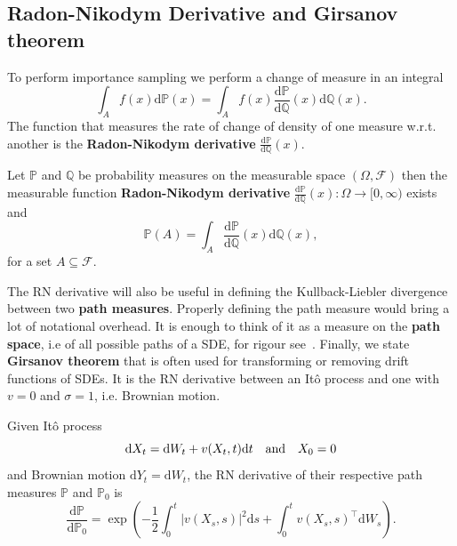 \subsection{Radon-Nikodym Derivative and Girsanov theorem}
To perform importance sampling we perform a change of measure in an integral
\begin{equation}
	\int_{A} f(x) \mathrm{d} \mathbb{P}(x)=\int_{A} f(x) \frac{\mathrm{d} \mathbb{P}}{\mathrm{d} \mathbb{Q}}(x) \mathrm{d} \mathbb{Q}(x).
\end{equation}
The function that measures the rate of change of density of one measure w.r.t. another is the \textbf{Radon-Nikodym derivative} $\frac{\mathrm{d} \mathbb{P}}{\mathrm{d} \mathbb{Q}}(x)$.

\begin{theorem}
	Let $\mathbb{P}$ and $\mathbb{Q}$ be probability measures on the measurable space $(\Omega, \mathcal{F})$ then the measurable function \textbf{Radon-Nikodym derivative} $\frac{\mathrm{d} \mathbb{P}}{\mathrm{d} \mathbb{Q}}(x): \Omega \rightarrow[0, \infty)$ exists and 
	\begin{equation}
		\mathbb{P}(A)=\int_{A} \frac{\mathrm{d} \mathbb{P}}{\mathrm{d} \mathbb{Q}}(x) \mathrm{d} \mathbb{Q}(x),
	\end{equation}
	for a set $A \subseteq \mathcal{F}$.
\end{theorem}
The RN derivative will also be useful in defining the Kullback-Liebler divergence between two \textbf{path measures}. Properly defining the path measure would bring a lot of notational overhead. It is enough to think of it as a measure on the \textbf{path space}, i.e of all possible paths of a SDE, for rigour see~\cite{leonard2014pathmeasure}. 
Finally, we state \textbf{Girsanov theorem} that is often used for transforming or removing drift functions of SDEs. It is the RN derivative between an It\^ o process and one with $v = 0$ and $\sigma = 1$, i.e. Brownian motion. 
\begin{theorem}
	Given It\^ o process
	\begin{equation}
		\mathrm{d}X_t = \mathrm{d}W_t + v(X_t, t)\mathrm{d}t \quad \text{and} \quad X_0 = 0 \\
	\end{equation}
	and Brownian motion $\mathrm{d}Y_t = \mathrm{d}W_t$, the RN derivative of their respective path measures $\mathbb{P}$ and $\mathbb{P}_0$	is
	\begin{equation}
		\label{eq:Girsanov_theorem}
		\frac{\mathrm{d} \mathbb{P}}{\mathrm{d} \mathbb{P}_0}=
		\exp \left(
		-\frac{1}{2} \int_{0}^{t}\left|v(X_s, s)\right|^{2} \mathrm{d} s+\int_{0}^{t} v(X_s, s)^{\top} \mathrm{d} W_s\right).
	\end{equation}
\end{theorem}

